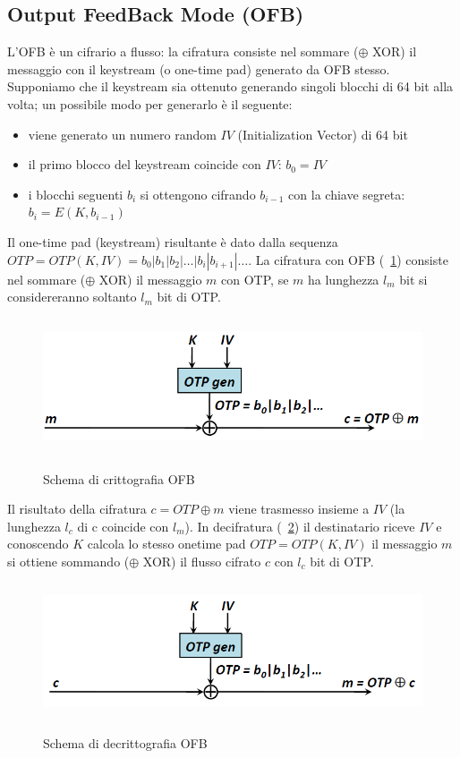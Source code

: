 \subsection{Output FeedBack Mode (OFB)}
L’OFB è un cifrario a flusso: la cifratura consiste nel sommare ($\oplus$ XOR) il messaggio con il keystream (o one-time pad) generato da OFB stesso. Supponiamo che il keystream sia ottenuto generando singoli blocchi di 64 bit alla volta; un possibile modo per generarlo è il seguente:
\begin{itemize}
\item viene generato un numero random $IV$ (Initialization Vector) di 64 bit
\item il primo blocco del keystream coincide con $IV$: $b_{0} = IV$
\item i blocchi seguenti $b_{i}$ si ottengono cifrando $b_{i-1}$ con la chiave segreta: $b_{i} = E(K,b_{i-1})$
\end{itemize}
Il one-time pad (keystream) risultante è dato dalla sequenza $OTP = OTP(K, IV) = b_{0}|b_{1}|b_{2}|…|b_{i}|b_{i+1}|…$.
La cifratura con OFB (\figurename ~\ref{fig:OFB_enc}) consiste nel sommare ($\oplus$ XOR) il messaggio $m$ con OTP, se $m$ ha lunghezza $l_{m}$ bit si considereranno soltanto $l_{m}$ bit di OTP.
\begin{figure}[htbp]
	\centering%
	\subfigure%
	{\includegraphics[height=4cm, width=12cm, keepaspectratio]{Immagini/Capitolo3/OFB_enc.png}}
	\caption{Schema di crittografia OFB \label{fig:OFB_enc}} 	
\end{figure}
Il risultato della cifratura $c = OTP \oplus m$ viene trasmesso insieme a $IV$ (la lunghezza $l_{c}$ di c coincide con $l_{m}$).\newline
In decifratura (\figurename ~\ref{fig:OFB_dec}) il destinatario riceve $IV$ e conoscendo $K$ calcola lo stesso onetime pad $OTP = OTP(K, IV)$  il messaggio $m$ si ottiene sommando ($\oplus$ XOR) il flusso cifrato $c$ con $l_{c}$ bit di OTP.
\begin{figure}[htbp]
	\centering%
	\subfigure%
	{\includegraphics[height=4cm, width=12cm, keepaspectratio]{Immagini/Capitolo3/OFB_dec.png}}
	\caption{Schema di decrittografia OFB \label{fig:OFB_dec}} 	
\end{figure}
